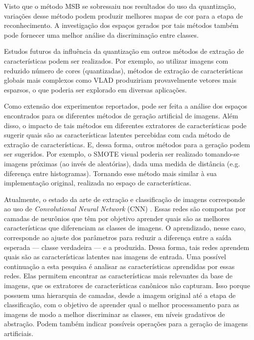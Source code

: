 Visto que o método MSB se sobressaiu nos resultados do uso da quantização, variações desse método podem produzir melhores mapas de cor para a etapa de reconhecimento. A investigação dos espaços gerados por tais métodos também pode fornecer uma melhor análise da discriminação entre classes.

Estudos futuros da influência da quantização em outros métodos de extração de características podem ser realizados. Por exemplo, ao utilizar imagens com reduzido número de cores (quantizadas), métodos de extração de características globais mais complexos como VLAD produziriam provavelmente vetores mais esparsos, o que poderia ser explorado em diversas aplicações.

Como extensão dos experimentos reportados, pode ser feita a análise dos espaços encontrados para os diferentes métodos de geração artificial de imagens. Além disso, o impacto de tais métodos em diferentes extratores de características pode sugerir quais são as características latentes percebidas com cada método de extração de características. E, dessa forma, outros métodos para a geração podem ser sugeridos. Por exemplo, o SMOTE visual poderia ser realizado tomando-se imagens próximas (ao invés de aleatórias), dada uma medida de distância (e.g. diferença entre histogramas). Tornando esse método mais similar à sua implementação original, realizada no espaço de características.

Atualmente, o estado da arte de extração e classificação de imagens corresponde ao uso de \textit{Convolutional Neural Network} (CNN) \cite{Schmidhuber2014}. Essas redes são compostas por camadas de neurônios que têm por objetivo aprender quais são as melhores características que diferenciam as classes de imagens. O aprendizado, nesse caso, corresponde ao ajuste dos parâmetros para reduzir a diferença entre a saída esperada --- classe verdadeira --- e a produzida. Dessa forma, tais redes aprendem quais são as características latentes nas imagens de entrada. Uma possível continuação a esta pesquisa é analisar as características aprendidas por essas redes. Elas permitem encontrar as características mais relevantes da base de imagens, que os extratores de características canônicos não capturam. Isso porque possuem uma hierarquia de camadas, desde a imagem original até a etapa de classificação, com o objetivo de aprender qual o melhor processamento para as imagens de modo a melhor discriminar as classes, em níveis gradativos de abstração. Podem também indicar possíveis operações para a geração de imagens artificiais.


